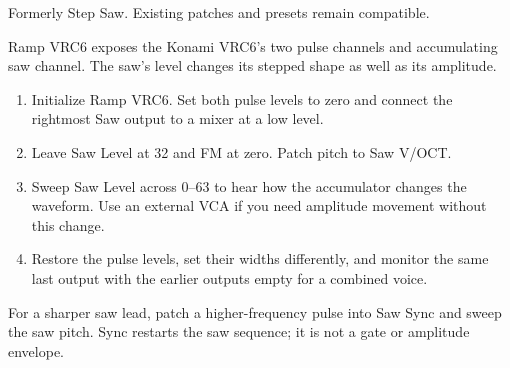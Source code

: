 Formerly Step Saw. Existing patches and presets remain compatible.

Ramp VRC6 exposes the Konami VRC6's two pulse channels and accumulating saw
channel. The saw's level changes its stepped shape as well as its amplitude.

\begin{enumerate}
\item Initialize Ramp VRC6. Set both pulse levels to zero and connect the
rightmost Saw output to a mixer at a low level.
\item Leave Saw Level at 32 and FM at zero. Patch pitch to Saw V/OCT.
\item Sweep Saw Level across 0--63 to hear how the accumulator changes the
waveform. Use an external VCA if you need amplitude movement without this change.
\item Restore the pulse levels, set their widths differently, and monitor
the same last output with the earlier outputs empty for a combined voice.
\end{enumerate}

For a sharper saw lead, patch a higher-frequency pulse into Saw Sync and
sweep the saw pitch. Sync restarts the saw sequence; it is not a gate or
amplitude envelope.
